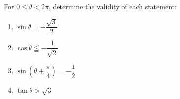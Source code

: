 \documentclass[8pt,dvipdfmx]{article}[b5paper]
\begin{document}
\begin{tcolorbox}[title=数学\textcircled{\scriptsize 3} 1-2 A]
For $0 \leq \theta < 2\pi$, determine the validity of each statement:
  \begin{enumerate}
    \item $\sin \theta = -\dfrac{\sqrt{3}}{2}$
    \item $\cos \theta \leqq -\dfrac{1}{\sqrt{2}}$
    \item $\sin\left(\theta + \dfrac{\pi}{4}\right) = -\dfrac{1}{2}$
    \item $\tan \theta > \sqrt{3}$
  \end{enumerate}
\end{tcolorbox}
\end{document}
